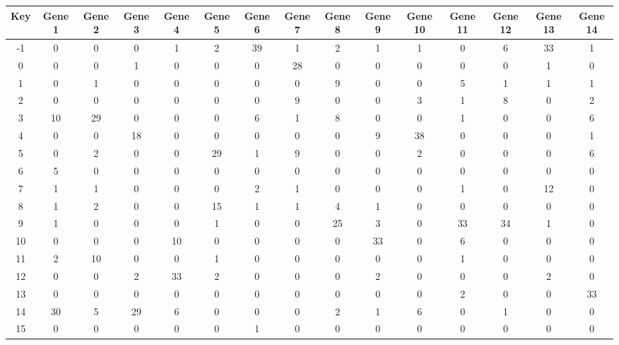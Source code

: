 \begin{tabular}{|c|c|c|c|c|c|c|c|c|c|c|c|c|c|c|}
\hline
Key & Gene 1 & Gene 2 & Gene 3 & Gene 4 & Gene 5 & Gene 6 & Gene 7 & Gene 8 & Gene 9 & Gene 10 & Gene 11 & Gene 12 & Gene 13 & Gene 14 \\
\hline
-1 & 0 & 0 & 0 & 1 & 2 & 39 & 1 & 2 & 1 & 1 & 0 & 6 & 33 & 1 \\
0 & 0 & 0 & 1 & 0 & 0 & 0 & 28 & 0 & 0 & 0 & 0 & 0 & 1 & 0 \\
1 & 0 & 1 & 0 & 0 & 0 & 0 & 0 & 9 & 0 & 0 & 5 & 1 & 1 & 1 \\
2 & 0 & 0 & 0 & 0 & 0 & 0 & 9 & 0 & 0 & 3 & 1 & 8 & 0 & 2 \\
3 & 10 & 29 & 0 & 0 & 0 & 6 & 1 & 8 & 0 & 0 & 1 & 0 & 0 & 6 \\
4 & 0 & 0 & 18 & 0 & 0 & 0 & 0 & 0 & 9 & 38 & 0 & 0 & 0 & 1 \\
5 & 0 & 2 & 0 & 0 & 29 & 1 & 9 & 0 & 0 & 2 & 0 & 0 & 0 & 6 \\
6 & 5 & 0 & 0 & 0 & 0 & 0 & 0 & 0 & 0 & 0 & 0 & 0 & 0 & 0 \\
7 & 1 & 1 & 0 & 0 & 0 & 2 & 1 & 0 & 0 & 0 & 1 & 0 & 12 & 0 \\
8 & 1 & 2 & 0 & 0 & 15 & 1 & 1 & 4 & 1 & 0 & 0 & 0 & 0 & 0 \\
9 & 1 & 0 & 0 & 0 & 1 & 0 & 0 & 25 & 3 & 0 & 33 & 34 & 1 & 0 \\
10 & 0 & 0 & 0 & 10 & 0 & 0 & 0 & 0 & 33 & 0 & 6 & 0 & 0 & 0 \\
11 & 2 & 10 & 0 & 0 & 1 & 0 & 0 & 0 & 0 & 0 & 1 & 0 & 0 & 0 \\
12 & 0 & 0 & 2 & 33 & 2 & 0 & 0 & 0 & 2 & 0 & 0 & 0 & 2 & 0 \\
13 & 0 & 0 & 0 & 0 & 0 & 0 & 0 & 0 & 0 & 0 & 2 & 0 & 0 & 33 \\
14 & 30 & 5 & 29 & 6 & 0 & 0 & 0 & 2 & 1 & 6 & 0 & 1 & 0 & 0 \\
15 & 0 & 0 & 0 & 0 & 0 & 1 & 0 & 0 & 0 & 0 & 0 & 0 & 0 & 0 \\
\hline
\end{tabular}